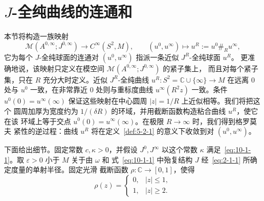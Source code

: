 
\section{$J$-全纯曲线的连通和}\label{sec:10-2}

本节将构造一族映射
\[
  \mathcal M(A^{0,\infty};J^{0,\infty})
  \longrightarrow C^\infty(S^2,M),
  \qquad
  (u^0,u^\infty)\longmapsto
  u^R:=u^0\mathbin{\#_R}u^\infty,
\]
它为每个 $J$-全纯球面的连通对 $(u^0,u^\infty)$ 指派一条近似 $J^R$-全纯球面 $u^R$。
更准确地说，该映射只定义在模空间 $\mathcal M(A^{0,\infty};J^{0,\infty})$ 的紧子集上，
而且对每个紧子集，只在 $R$ 充分大时定义。近似 $J^R$-全纯曲线
$u^R:S^2=\mathbb C\cup\{\infty\}\to M$ 在远离 $0$ 处与 $u^0$ 一致，在非常靠近
$0$ 处则与重标度曲线 $u^\infty(R^2z)$ 一致。条件
$u^0(0)=u^\infty(\infty)$ 保证这些映射在中心圆周 $|z|=1/R$ 上近似相等。我们将把这个
圆周加厚为宽度约为 $1/(\delta R)$ 的环域，并用截断函数构造粘合曲线 $u^R$，使它在该
环域上等于交点 $u^0(0)=u^\infty(\infty)$。在极限 $R\to\infty$ 时，我们得到格罗莫夫
紧性的逆过程：曲线 $u^R$ 将在定义~\ref{def:5-2-1} 的意义下收敛到对
$(u^0,u^\infty)$。

下面给出细节。固定常数 $c,\kappa>0$，并假设 $J^0,J^\infty$ 以这个常数 $\kappa$
满足~\eqref{eq:10-1-1}。取 $\varepsilon>0$ 小于 $M$ 关于由 $\omega$ 和
式~\eqref{eq:10-1-1} 中殆复结构 $J$ 经~\eqref{eq:2-1-1} 所确定度量的单射半径。固定光滑
截断函数 $\rho:\mathbb C\to[0,1]$，使得
\[
  \rho(z)=
  \begin{cases}
    0,& |z|\le1,\\
    1,& |z|\ge2.
  \end{cases}
\]

